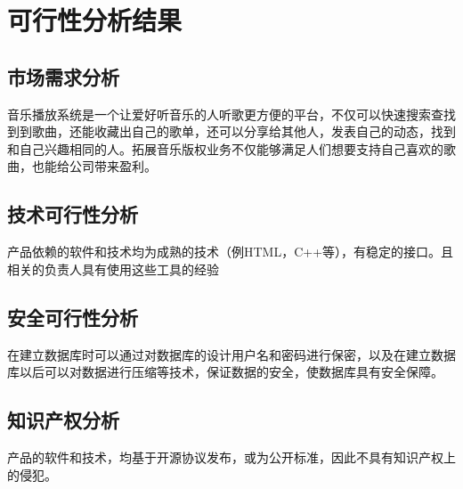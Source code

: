 \chapter{可行性分析结果}

\section{市场需求分析}

音乐播放系统是一个让爱好听音乐的人听歌更方便的平台，不仅可以快速搜索查找到到歌曲，还能收藏出自己的歌单，还可以分享给其他人，发表自己的动态，找到和自己兴趣相同的人。拓展音乐版权业务不仅能够满足人们想要支持自己喜欢的歌曲，也能给公司带来盈利。

\section{技术可行性分析}

产品依赖的软件和技术均为成熟的技术（例HTML，C++等），有稳定的接口。且相关的负责人具有使用这些工具的经验

\section{安全可行性分析}

在建立数据库时可以通过对数据库的设计用户名和密码进行保密，以及在建立数据库以后可以对数据进行压缩等技术，保证数据的安全，使数据库具有安全保障。

\section{知识产权分析}

产品的软件和技术，均基于开源协议发布，或为公开标准，因此不具有知识产权上的侵犯。